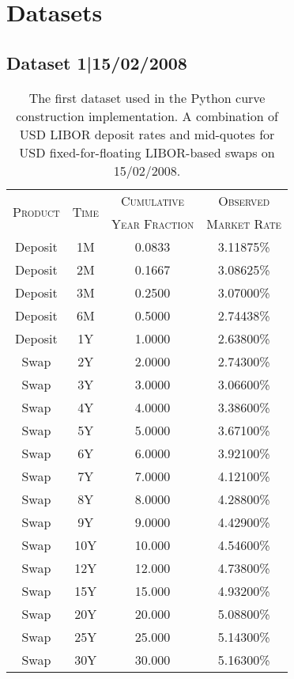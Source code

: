 
\section{Datasets}
\label{datasets}
\subsection*{Dataset 1|15/02/2008}

\begin{table}[ht]
\begin{center}
\begin{tabular}{cccc}

\toprule
\multirow{2}{*}{\textsc{Product}} & \multirow{2}{*}{\textsc{Time}} & \textsc{Cumulative} & \textsc{Observed} \\
 & & \textsc{Year Fraction} & \textsc{Market Rate} \\
\toprule

Deposit & 1M & 0.0833 & 3.11875\% \\
Deposit & 2M & 0.1667 & 3.08625\% \\
Deposit & 3M & 0.2500 & 3.07000\% \\
Deposit & 6M & 0.5000 & 2.74438\% \\
Deposit & 1Y & 1.0000 & 2.63800\% \\

Swap & 2Y & 2.0000 & 2.74300\% \\
Swap & 3Y & 3.0000 & 3.06600\% \\
Swap & 4Y & 4.0000 & 3.38600\% \\
Swap & 5Y & 5.0000 & 3.67100\% \\
Swap & 6Y & 6.0000 & 3.92100\% \\
Swap & 7Y & 7.0000 & 4.12100\% \\
Swap & 8Y & 8.0000 & 4.28800\% \\
Swap & 9Y & 9.0000 & 4.42900\% \\
Swap & 10Y & 10.000 & 4.54600\% \\
Swap & 12Y & 12.000 & 4.73800\% \\
Swap & 15Y & 15.000 & 4.93200\% \\
Swap & 20Y & 20.000 & 5.08800\% \\
Swap & 25Y & 25.000 & 5.14300\% \\
Swap & 30Y & 30.000 & 5.16300\% \\
\toprule

\end{tabular}
\end{center}
\caption[Dataset|15/02/2008]{The first dataset used in the Python curve construction  implementation. A combination of USD LIBOR deposit rates and mid-quotes for USD fixed-for-floating LIBOR-based swaps on 15/02/2008.}
\label{tab:dataset_1}
\end{table}

